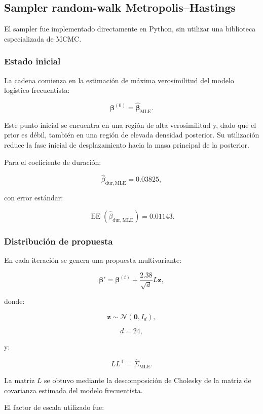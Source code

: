 \subsection{Sampler random-walk Metropolis--Hastings}

El sampler fue implementado directamente en Python, sin utilizar una
biblioteca especializada de MCMC.

\subsubsection{Estado inicial}

La cadena comienza en la estimación de máxima verosimilitud del modelo
logístico frecuentista:

\[
\boldsymbol{\beta}^{(0)}
=
\widehat{\boldsymbol{\beta}}_{\mathrm{MLE}}.
\]

Este punto inicial se encuentra en una región de alta verosimilitud y,
dado que el prior es débil, también en una región de elevada densidad
posterior. Su utilización reduce la fase inicial de desplazamiento hacia
la masa principal de la posterior.

Para el coeficiente de duración:

\[
\widehat{\beta}_{\mathrm{dur,MLE}}
=
0.03825,
\]

con error estándar:

\[
\operatorname{EE}
\left(
    \widehat{\beta}_{\mathrm{dur,MLE}}
\right)
=
0.01143.
\]

\subsubsection{Distribución de propuesta}

En cada iteración se genera una propuesta multivariante:

\[
\boldsymbol{\beta}'
=
\boldsymbol{\beta}^{(t)}
+
\frac{2.38}{\sqrt{d}}
L\mathbf{z},
\]

donde:

\[
\mathbf{z}
\sim
\mathcal{N}
\left(
    \mathbf{0},I_d
\right),
\]

\[
d=24,
\]

y:

\[
LL^{\mathsf{T}}
=
\widehat{\Sigma}_{\mathrm{MLE}}.
\]

La matriz \(L\) se obtuvo mediante la descomposición de Cholesky de la
matriz de covarianza estimada del modelo frecuentista.

El factor de escala utilizado fue:

